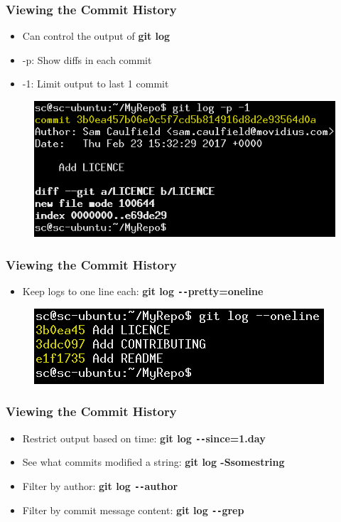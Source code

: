 \documentclass{beamer}
\begin{document}
\begin{frame}
	\frametitle{Viewing the Commit History}
	\begin{itemize}
		\item{Can control the output of \textbf{git log}}
		\item{-p: Show diffs in each commit}
		\item{-1: Limit output to last 1 commit}
	\end{itemize}
	\begin{figure}
		\includegraphics[scale=0.6]{Viewing_the_Commit_History-1.png}
	\end{figure}
\end{frame}

\begin{frame}
	\frametitle{Viewing the Commit History}
	\begin{itemize}
		\item{Keep logs to one line each: \textbf{git log \texttt{-{}-}pretty=oneline}}
	\end{itemize}
	\begin{figure}
		\includegraphics[scale=0.6]{Viewing_the_Commit_History-2.png}
	\end{figure}
\end{frame}

\begin{frame}
	\frametitle{Viewing the Commit History}
	\begin{itemize}
		\item{Restrict output based on time: \textbf{git log \texttt{-{}-}since=1.day}}
		\item{See what commits modified a string: \textbf{git log -Ssomestring}}
		\item{Filter by author: \textbf{git log \texttt{-{}-}author}}
		\item{Filter by commit message content: \textbf{git log \texttt{-{}-}grep}}
	\end{itemize}
\end{frame}
\end{document}
